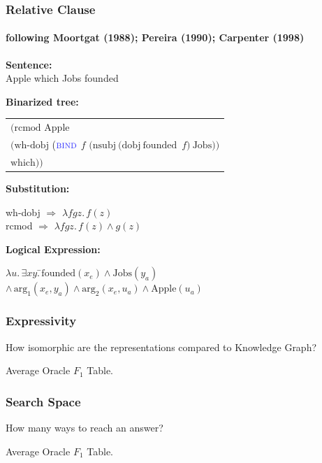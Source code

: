 \documentclass[mathserif,12pt]{beamer}
\newcommand{\hlight}[1]{{\color{blue!80} #1}}
\renewcommand{\land}{\wedge}
\newcommand{\lspace}{.\,}
\newcommand{\bind}{\textsc{bind}}
\begin{document}
\begin{frame}[noframenumbering]
\frametitle{Relative Clause}
\framesubtitle{following Moortgat (1988); Pereira (1990); Carpenter (1998)}
\textbf{Sentence:} \\
{\centering Apple which Jobs founded\\} 

\textbf{Binarized tree:} \\
\begin{small}
\begin{tabular}{l}\\
$\mathrm{(rcmod}$  $\mathrm{Apple}$ \\ 
  \hspace*{1cm} $\mathrm{(wh}$-$\mathrm{dobj}$
  ($\hlight{\bind}$ $f$ $\mathrm{(nsubj~(dobj~founded}$~$f$$\mathrm{)~Jobs))}$ \\
\hspace*{2.5cm} $\mathrm{which))}$
\end{tabular}
\end{small}

\pause
\textbf{Substitution:} 
\begin{tabbing}
wh-dobj $\Rightarrow$ $\lambda f g z \lspace f(z)$\\
rcmod $\Rightarrow$ $\lambda f g z \lspace f(z) \land g(z)$
\end{tabbing}

\textbf{Logical Expression:}
\begin{tabbing}
$\lambda u \lspace \exists x y \lspace$\=$\mathrm{founded}(x_e) \land \mathrm{Jobs}(y_a)$\\
\>$\land\, \mathrm{arg_1}(x_e, y_a)
\land \mathrm{arg_2}(x_e, u_a) \land \mathrm{Apple}(u_a)$
\end{tabbing}
\end{frame}

\begin{frame}[noframenumbering]
\frametitle{Expressivity}
How isomorphic are the representations compared to Knowledge Graph?

Average Oracle $F_1$ Table.

\end{frame}

\begin{frame}[noframenumbering]
\frametitle{Search Space}
How many ways to reach an answer? 

Average Oracle $F_1$ Table.

\end{frame}
\end{document}

